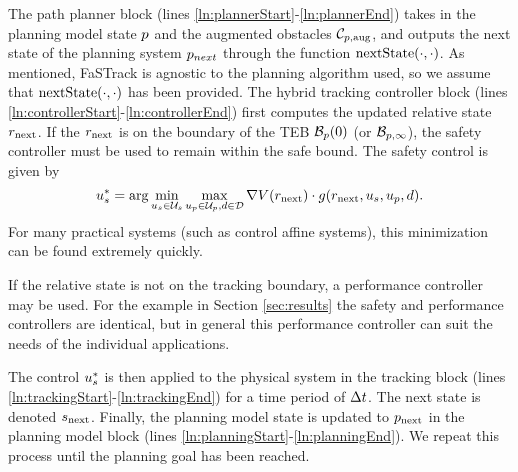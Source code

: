 The path planner block (lines \ref{ln:plannerStart}-\ref{ln:plannerEnd}) takes in the planning model state $p$ and the augmented obstacles $\mathcal C_{p,\text{aug}}$, and outputs the next state of the planning system $p_{next}$ through the function $\text{nextState}(\cdot, \cdot)$.
As mentioned, FaSTrack is agnostic to the planning algorithm used, so we assume that $\text{nextState}(\cdot, \cdot)$ has been provided.
The hybrid tracking controller block (lines \ref{ln:controllerStart}-\ref{ln:controllerEnd}) first computes the updated relative state $r_\text{next}$. 
If the $r_\text{next}$ is on the boundary of the TEB $\mathcal B_p(0)$ (or $\mathcal B_{p, \infty}$), the safety controller must be used to remain within the safe bound. 
The safety control is given by
\begin{equation}
  \label{eq:opt_ctrl}
	\tctrl^* = \arg\min_{\tctrl\in\tcset} \max_{\pctrl\in\pcset, \dstb\in\dset} \nabla\valfunc(\rstate_\text{next}) \cdot \rdyn(\rstate_\text{next},\tctrl,\pctrl,\dstb).
\end{equation}
For many practical systems (such as control affine systems), this minimization can be found extremely quickly.

If the relative state is not on the tracking boundary, a performance controller may be used. For the example in Section \ref{sec:results} the safety and performance controllers are identical, but in general this performance controller can suit the needs of the individual applications.

The control $u_s^*$ is then applied to the physical system in the tracking block (lines \ref{ln:trackingStart}-\ref{ln:trackingEnd}) for a time period of $\Delta t$. 
The next state is denoted $s_\text{next}$. 
Finally, the planning model state is updated to $p_\text{next}$ in the planning model block (lines \ref{ln:planningStart}-\ref{ln:planningEnd}). 
We repeat this process until the planning goal has been reached.